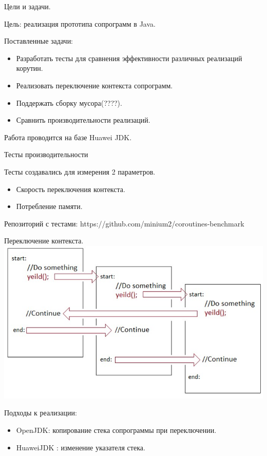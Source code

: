 \begin{frame}{Цели и задачи.}
	
	Цель: реализация прототипа сопрограмм в Java.
	\par
	Поставленные задачи:
	\begin{itemize}
		\item Разработать тесты для сравнения эффективности различных реализаций корутин.
		\item Реализовать переключение контекста сопрограмм.
		\item Поддержать сборку мусора(????).
		\item Сравнить производительности реализаций.
	\end{itemize}

	Работа проводится на базе Huawei JDK.
\end{frame}

\begin{frame}{Тесты производительности}
	
	Тесты создавались для измерения 2 параметров.
	\begin{itemize}
		\item Скорость переключения контекста.
		\item Потребление памяти.
	\end{itemize}
	Репозиторий с тестами: https://github.com/minium2/coroutines-benchmark
	
\end{frame}

\begin{frame}{Переключение контекста.}
	\includegraphics[scale=0.5]{images/scheme.jpg}
	\par
	Подходы к реализации:
	\begin{itemize}
		\item OpenJDK: копирование стека сопрограммы при переключении.
		\item HuaweiJDK : изменение указателя стека.
	\end{itemize}
\end{frame}

